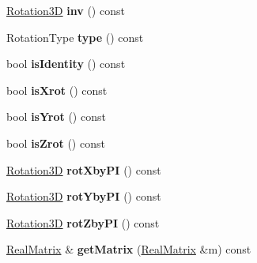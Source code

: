 \begin{DoxyCompactItemize}
\hyperlink{classRotation3D}{Rotation3D} {\bfseries inv} () const
\item 
\mbox{\label{classRotation3D_a3c3e11132cbd0ce4d62b0750a1cf864c}} 
Rotation\+Type {\bfseries type} () const
\item 
\mbox{\label{classRotation3D_a40f40fecdb7e00ae4278070457486c39}} 
bool {\bfseries is\+Identity} () const
\item 
\mbox{\label{classRotation3D_aa63aa9726e36d6959a941ae889182248}} 
bool {\bfseries is\+Xrot} () const
\item 
\mbox{\label{classRotation3D_a6c465343776cfd2597a262f6834d52c1}} 
bool {\bfseries is\+Yrot} () const
\item 
\mbox{\label{classRotation3D_aa5972c59f83f94018f6d55e5bc125881}} 
bool {\bfseries is\+Zrot} () const
\item 
\mbox{\label{classRotation3D_ac9b241f04b01a6d22133177d2db4601b}} 
\hyperlink{classRotation3D}{Rotation3D} {\bfseries rot\+Xby\+PI} () const
\item 
\mbox{\label{classRotation3D_a6c1cc6409f9adab869745f003c1b4962}} 
\hyperlink{classRotation3D}{Rotation3D} {\bfseries rot\+Yby\+PI} () const
\item 
\mbox{\label{classRotation3D_aae78095c192d01e4c2b084cb139ad955}} 
\hyperlink{classRotation3D}{Rotation3D} {\bfseries rot\+Zby\+PI} () const
\item 
\mbox{\label{classRotation3D_a5a5b87686c4d8a369e181a901e3c4807}} 
\hyperlink{classTLAS_1_1Matrix}{Real\+Matrix} \& {\bfseries get\+Matrix} (\hyperlink{classTLAS_1_1Matrix}{Real\+Matrix} \&m) const
\end{DoxyCompactItemize}
